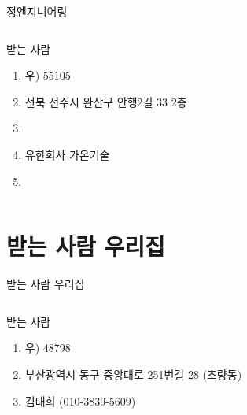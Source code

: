\documentclass[aspectratio=1610,12pt,xcolor=pdftex,dvipsnames,table,handout]{beamer}
\begin{document}
		\begin{frame}[c,plain]{정엔지니어링}

		\begin{columns}[t]
		\begin{column}{1.0\textwidth}

			\begin{block} {받는 사람}
			\begin{enumerate}
			\item [] 우) 55105
			\item [] 전북 전주시 완산구 안행2길 33 2층
			\item []
			\item [] 유한회사 가온기술
			\item [] 
			\end{enumerate}
			\end{block}

		\end{column}

		\begin{column}{.2\textwidth}
		\end{column}
		\end{columns}

		\end{frame}


		\section{받는 사람 우리집}
		\begin{frame}[c,plain]{받는 사람 우리집}

		\begin{columns}[t]
		\begin{column}{1.0\textwidth}

			\begin{block} {받는 사람}
			\begin{enumerate}
			\item [] 우) 48798
			\item [] 부산광역시 동구 중앙대로 251번길 28 (초량동)
			\item [] 김대희 (010-3839-5609)
			\end{enumerate}
			\end{block}
		\end{column}
		\end{columns}

		\end{frame}
\end{document}
